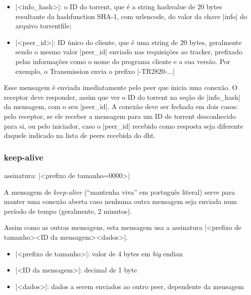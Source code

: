 \begin{itemize}
    \item \bverb|<info_hash>|: o ID do \gls*{torrent}, que é a \gls*{string}
        \gls*{hashvalue} de 20 bytes resultante da \gls*{hashfunction} SHA-1, com
        \gls*{urlencode}, do valor da chave \bverb|info| do arquivo \gls*{torrentfile};

    \item \bverb|<peer_id>|: ID único do cliente, que é uma \gls*{string} de 20 bytes,
        geralmente sendo o mesmo valor \bverb|peer_id| enviado nas requisições ao
        \gls*{tracker}, prefixado pelas informações como o nome do programa cliente e a
        sua versão. Por exemplo, o Transmission envia o prefixo \sverb|-TR2820-...|
\end{itemize}

Esse mensagem é enviada imediatamente pelo \gls*{peer} que inicia uma conexão. O
receptor deve responder, assim que ver o ID do \gls*{torrent} na seção de
\bverb|info_hash| da mensagem, com o seu \bverb|peer_id|. A conexão deve ser fechada em
dois casos: pelo receptor, se ele receber a mensagem para um ID de \gls*{torrent}
desconhecido para si, ou pelo iniciador, caso o \bverb|peer_id| recebido como resposta
seja diferente daquele indicado na lista de \glspl*{peer} recebida do \gls*{dht}.

\subsubsection*{keep-alive}

assinatura: \bverb|<prefixo de tamanho=0000>|

A mensagem de \emph{keep-alive} (``mantenha viva'' em português literal) serve para
manter uma conexão aberta caso nenhuma outra mensagem seja enviada num período de tempo
(geralmente, 2 minutos).

Assim como as outras mensagens, esta mensagem usa a assinatura
\bverb|<prefixo de tamanho><ID da mensagem><dados>|.

\begin{itemize}
    \item \bverb|<prefixo de tamanho>|: valor de 4 bytes em \emph{big} \gls{endian}

    \item \bverb|<ID da mensagem>|: decimal de 1 byte

    \item \bverb|<dados>|: dados a serem enviados ao outro \gls*{peer}, dependente da
        mensagem
\end{itemize}

